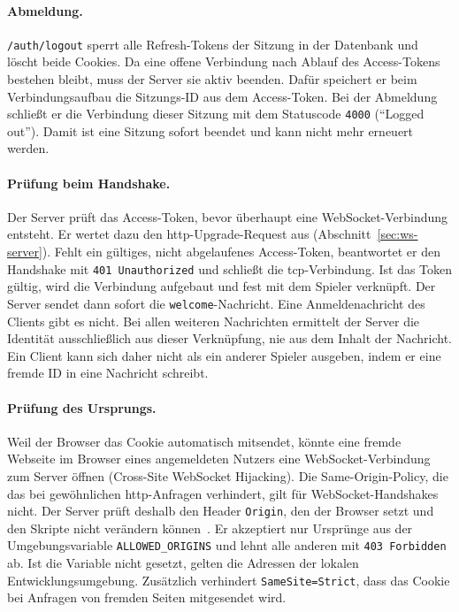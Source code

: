 \paragraph{Abmeldung.} \texttt{/auth/logout} sperrt alle Refresh-Tokens der Sitzung in der Datenbank und löscht beide Cookies. Da eine offene Verbindung nach Ablauf des Access-Tokens bestehen bleibt, muss der Server sie aktiv beenden. Dafür speichert er beim Verbindungsaufbau die Sitzungs-ID aus dem Access-Token. Bei der Abmeldung schließt er die Verbindung dieser Sitzung mit dem Statuscode \texttt{4000} (\enquote{Logged out}). Damit ist eine Sitzung sofort beendet und kann nicht mehr erneuert werden.

\paragraph{Prüfung beim Handshake.} Der Server prüft das Access-Token, bevor überhaupt eine WebSocket-Verbindung entsteht. Er wertet dazu den \gls{http}-Upgrade-Request aus (Abschnitt~\ref{sec:ws-server}). Fehlt ein gültiges, nicht abgelaufenes Access-Token, beantwortet er den Handshake mit \texttt{401 Unauthorized} und schließt die \gls{tcp}-Verbindung. Ist das Token gültig, wird die Verbindung aufgebaut und fest mit dem Spieler verknüpft. Der Server sendet dann sofort die \texttt{welcome}-Nachricht. Eine Anmeldenachricht des Clients gibt es nicht. Bei allen weiteren Nachrichten ermittelt der Server die Identität ausschließlich aus dieser Verknüpfung, nie aus dem Inhalt der Nachricht. Ein Client kann sich daher nicht als ein anderer Spieler ausgeben, indem er eine fremde ID in eine Nachricht schreibt.

\paragraph{Prüfung des Ursprungs.} Weil der Browser das Cookie automatisch mitsendet, könnte eine fremde Webseite im Browser eines angemeldeten Nutzers eine WebSocket-Verbindung zum Server öffnen (Cross-Site WebSocket Hijacking). Die Same-Origin-Policy, die das bei gewöhnlichen \gls{http}-Anfragen verhindert, gilt für WebSocket-Handshakes nicht. Der Server prüft deshalb den Header \texttt{Origin}, den der Browser setzt und den Skripte nicht verändern können~\cite[Abschn.~10.2]{RFC6455}. Er akzeptiert nur Ursprünge aus der Umgebungsvariable \texttt{ALLOWED\_ORIGINS} und lehnt alle anderen mit \texttt{403 Forbidden} ab. Ist die Variable nicht gesetzt, gelten die Adressen der lokalen Entwicklungsumgebung. Zusätzlich verhindert \texttt{SameSite=Strict}, dass das Cookie bei Anfragen von fremden Seiten mitgesendet wird.



